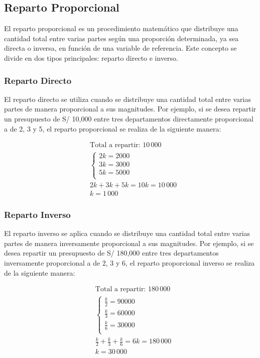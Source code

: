 \documentclass[
  stu,
  floatsintext,
  longtable,
  a4paper,
  nolmodern,
  notxfonts,
  notimes,
  colorlinks=true,linkcolor=blue,citecolor=blue,urlcolor=blue]{apa7}
\begin{document}
\subsection{Reparto Proporcional}\label{reparto-proporcional}

El reparto proporcional es un procedimiento matemático que distribuye
una cantidad total entre varias partes según una proporción determinada,
ya sea directa o inversa, en función de una variable de referencia. Este
concepto se divide en dos tipos principales: reparto directo e inverso.

\subsubsection{Reparto Directo}\label{reparto-directo}

El reparto directo se utiliza cuando se distribuye una cantidad total
entre varias partes de manera proporcional a sus magnitudes. Por
ejemplo, si se desea repartir un presupuesto de S/ 10,000 entre tres
departamentos directamente proporcional a de 2, 3 y 5, el reparto
proporcional se realiza de la siguiente manera:

\begin{align*}
&\text{Total a repartir: } 10\,000 \\
&\begin{cases}
2k = 2000 \\
3k = 3000 \\
5k = 5000 \\
\end{cases} \\
&2k + 3k + 5k = 10k = 10\,000 \\
&k = 1\,000
\end{align*}

\subsubsection{Reparto Inverso}\label{reparto-inverso}

El reparto inverso se aplica cuando se distribuye una cantidad total
entre varias partes de manera inversamente proporcional a sus
magnitudes. Por ejemplo, si se desea repartir un presupuesto de S/
180,000 entre tres departamentos inversamente proporcional a de 2, 3 y
6, el reparto proporcional inverso se realiza de la siguiente manera:

\begin{align*}
&\text{Total a repartir: } 180\,000 \\
&\begin{cases}
\frac{k}{2} = 90000 \\
\frac{k}{3} = 60000 \\
\frac{k}{6} = 30000 \\
\end{cases} \\
&\frac{k}{2} + \frac{k}{3} + \frac{k}{6} = 6k = 180\,000 \\
&k = 30\,000
\end{align*}
\end{document}

